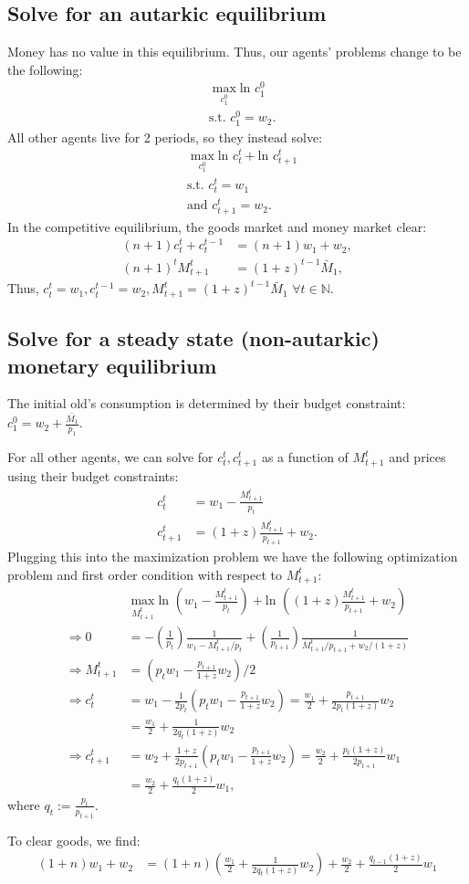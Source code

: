 \documentclass[11pt]{article} %
\begin{document}
\subsection{Solve for an autarkic equilibrium}
Money has no value in this equilibrium. Thus, our agents' problems change to be the following:
\begin{align*}
&\max_{c_1^0} \text{ln } c_1^0 \\
&\text{s.t. } c_1^0 = w_2 .
\end{align*}
All other agents live for 2 periods, so they instead solve:
\begin{align*}
&\max_{c_1^0} \text{ln } c_t^t + \text{ln } c_{t+1}^t \\
&\text{s.t. } c_t^t = w_1 \\
&\text{and } c_{t+1}^t = w_2.
\end{align*}
In the competitive equilibrium, the goods market and money market clear:
\begin{align*}
(n+1)c_t^t +c_t^{t-1} &= (n+1)w_1 + w_2, \\
(n+1)^t M_{t+1}^t  &= (1+z)^{t-1}\bar{M}_1,
\end{align*}
Thus, $c_t^t = w_1, c_t^{t-1} = w_2, M_{t+1}^t = (1+z)^{t-1}\bar{M}_1 $ $\forall t \in \mathbb{N}.$
\subsection{Solve for a steady state (non-autarkic) monetary equilibrium}
The initial old's consumption is determined by their budget constraint: $c_1^0 = w_2 + \frac{\bar{M_1}}{p_1}$.

For all other agents, we can solve for $c_t^t,c_{t+1}^{t}$ as a function of $M_{t+1}^t$ and prices using their budget constraints:
\begin{align*}
c_t^t &= w_1 - \frac{M_{t+1}^t}{p_t}\\
c_{t+1}^t &= (1+z)\frac{M^t_{t+1}}{p_{t+1}} + w_2.
\end{align*}
Plugging this into the maximization problem we have the following optimization problem and first order condition with respect to $M^t_{t+1}:$
\begin{align*}
&\max_{M_{t+1}^t} \text{ln } \left(w_1 - \frac{M_{t+1}^t}{p_t}\right) + \text{ln } \left((1+z)\frac{M^t_{t+1}}{p_{t+1}} + w_2\right) \\
\Rightarrow 0 &=  -\left(\frac{1}{p_t}\right)\frac{1}{w_1 - M^t_{t+1}/p_t} +\left(\frac{1}{p_{t+1}}\right) \frac{1}{M^t_{t+1}/p_{t+1} + w_2/(1+z)} \\
\Rightarrow M^t_{t+1} &= \left( p_tw_1 - \frac{p_{t+1}}{1+z}w_2\right)/2\\
\Rightarrow c_t^t &= w_1 - \frac{1}{2p_t}\left(  p_tw_1 - \frac{p_{t+1}}{1+z}w_2\right) = \frac{w_1}{2} + \frac{p_{t+1}}{2p_t(1+z)}w_2 \\
&= \frac{w_1}{2} + \frac{1}{2q_t(1+z)}w_2 \\
\Rightarrow c_{t+1}^t &= w_2 + \frac{1+z}{2p_{t+1}}\left(  p_tw_1 - \frac{p_{t+1}}{1+z}w_2\right) = \frac{w_2}{2} + \frac{p_t(1+z)}{2p_{t+1}}w_1 \\
&= \frac{w_2}{2} + \frac{q_t(1+z)}{2}w_1 ,
\end{align*}
where $q_t:= \frac{p_t}{p_{t+1}}$.

To clear goods, we find:
\begin{align*}
(1+n)w_1 + w_2 &= (1+n)\left(\frac{w_1}{2} + \frac{1}{2q_t(1+z)}w_2\right)+ \frac{w_2}{2} + \frac{q_{t-1}(1+z)}{2}w_1
\end{align*}
\end{document}
